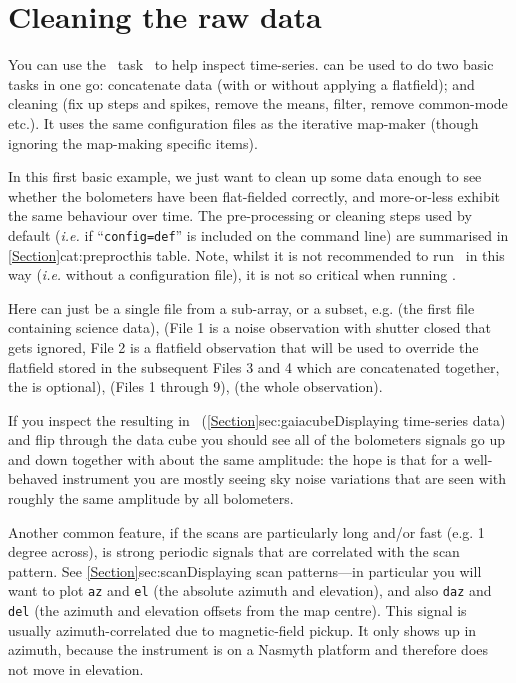 \chapter{Cleaning the raw data}
\label{app:clean}

You can use the \smurf\ task \clean\ to help inspect time-series.
 can be used to do two basic tasks in one go:
concatenate data (with or without applying a flatfield); and cleaning
(fix up steps and spikes, remove the means, filter, remove common-mode
etc.). It uses the same configuration files as the iterative map-maker
(though ignoring the map-making specific items).

In this first basic example, we just want to clean up some data enough
to see whether the bolometers have been flat-fielded correctly, and
more-or-less exhibit the same behaviour over time. The pre-processing
or cleaning steps used by default (\emph{i.e.} if ``\texttt{config=def}''
is included on the command line) are summarised in
\cref{Section}{cat:preproc}{this table}. Note, whilst it is not
recommended to run \makemap\ in this way (\emph{i.e.} without a
configuration file), it is not so critical when running \clean.

\begin{terminalv}
\end{terminalv}

Here  can just be a single file from a sub-array, or a
subset, e.g.  (the first file
containing science data),  (File
1 is a noise observation with shutter closed that gets ignored, File 2
is a flatfield observation that will be used to override the flatfield
stored in the subsequent Files 3 and 4 which are concatenated
together, the  is optional),
 (Files 1 through 9),
 (the whole observation).

If you inspect the resulting  in \gaia\
(\cref{Section}{sec:gaiacube}{Displaying time-series data}) and flip
through the data cube you should see all of the bolometers signals go
up and down together with about the same amplitude: the hope is that
for a well-behaved instrument you are mostly seeing sky noise
variations that are seen with roughly the same amplitude by all
bolometers.

Another common feature, if the scans are particularly long and/or fast
(e.g. 1\,degree across), is strong periodic signals that are
correlated with the scan pattern. See
\cref{Section}{sec:scan}{Displaying scan patterns}---in particular you
will want to plot \texttt{az} and \texttt{el} (the absolute azimuth
and elevation), and also \texttt{daz} and \texttt{del} (the azimuth
and elevation offsets from the map centre). This signal is usually
azimuth-correlated due to magnetic-field pickup. It only shows up in
azimuth, because the instrument is on a Nasmyth platform and therefore
does not move in elevation.

